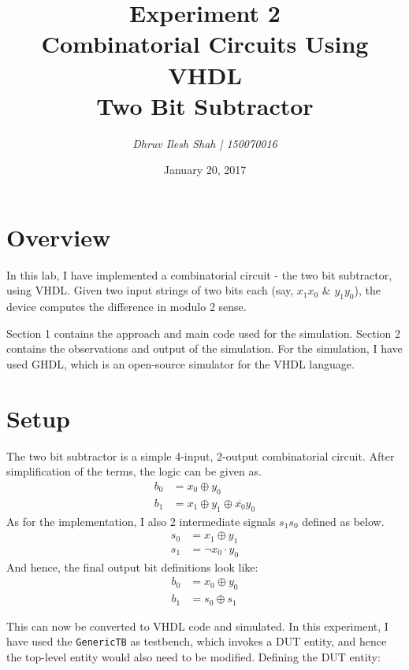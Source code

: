 \documentclass[a4paper, 11pt]{article}
\title{\bf Experiment 2\\\vspace*{2mm} Combinatorial Circuits Using VHDL\\Two Bit Subtractor}
\author{\it Dhruv Ilesh Shah | 150070016}
\date{January 20, 2017}
\begin{document}
\maketitle
\section*{Overview}
In this lab, I have implemented a combinatorial circuit - the two bit subtractor, using VHDL. Given two input strings of two bits each (say, $x_1x_0$ \& $y_1y_0$), the device computes the difference in modulo 2 sense.

Section 1 contains the approach and main code used for the simulation. Section 2 contains the observations and output of the simulation. For the simulation, I have used GHDL, which is an open-source simulator for the VHDL language.

\section{Setup}

The two bit subtractor is a simple 4-input, 2-output combinatorial circuit. After simplification of the terms, the logic can be given as.
\begin{equation}
\begin{split}
b_0 &= x_0 \oplus y_0 \\
b_1 &= x_1 \oplus y_1 \oplus \overline{x_0}y_0
\end{split}
\end{equation}
As for the implementation, I also 2 intermediate signals $s_1s_0$ defined as below.
\begin{equation}
\begin{split}
s_0 &= x_1 \oplus y_1 \\
s_1 &= \neg x_0 \cdot y_0
\end{split}
\end{equation}
And hence, the final output bit definitions look like:
\begin{equation}
\begin{split}
b_0 &= x_0 \oplus y_0 \\
b_1 &= s_0 \oplus s_1
\end{split}
\end{equation}

This can now be converted to VHDL code and simulated. In this experiment, I have used the \texttt{GenericTB} as testbench, which invokes a DUT entity, and hence the top-level entity would also need to be modified. Defining the DUT entity:
\end{document}
